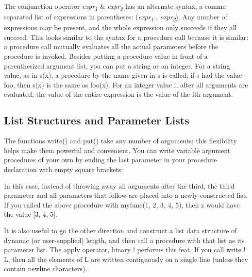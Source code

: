 The conjunction operator
\textsf{\textit{expr}}\textsf{\textit{\textsubscript{1}}}\textsf{ \&
}\textsf{\textit{expr}}\textsf{\textit{\textsubscript{2}}} has an
alternate syntax, a comma-separated list of expressions in parentheses:
\textsf{(}\textsf{\textit{expr}}\textsf{\textit{\textsubscript{1}}}\textsf{
, }\textsf{\textit{expr}}\textsf{\textit{\textsubscript{2}}}\textsf{)}.
Any number of expressions may be present, and the whole expression only
succeeds if they all succeed. This looks similar to the syntax for a
procedure call because it is similar: a procedure call mutually
evaluates all the actual parameters before the procedure is invoked.
Besides putting a procedure value in front of a parenthesized argument
list, you can put a string or an integer. For a string value, as in
\textsf{s(x)}, a procedure by the name given in \textsf{s} is called;
if \textsf{s} had the value \textsf{{\textquotedbl}foo{\textquotedbl}},
then \textsf{s(x)} is the same as \textsf{foo(x)}. For an integer value
\textsf{i}, after all arguments are evaluated, the value of the entire
expression is the value of the \textsf{i}{\textquotesingle}th argument.

\subsection{List Structures and Parameter Lists}

The functions \textsf{write()} and \textsf{put()} take any number of
arguments; this flexibility helps make them powerful and convenient.
You can write variable argument
procedures of your own by ending the last parameter in your procedure
declaration with empty square brackets:


In this case, instead of throwing away all arguments after the third,
the third parameter and all parameters that follow are placed into a
newly-constructed list. If you called the above procedure with
\textsf{myfunc(1, 2, 3, 4, 5)}, then \textsf{z} would have the value
\textsf{[3, 4, 5]}.

It is also useful to go the other direction and construct a list data
structure of dynamic (or user-supplied) length, and then call a
procedure with that list as its parameter list. The
apply operator, binary
\textsf{!} performs this feat. If you call \textsf{write ! L}, then all
the elements of \textsf{L} are written contiguously on a single line
(unless they contain newline characters).

